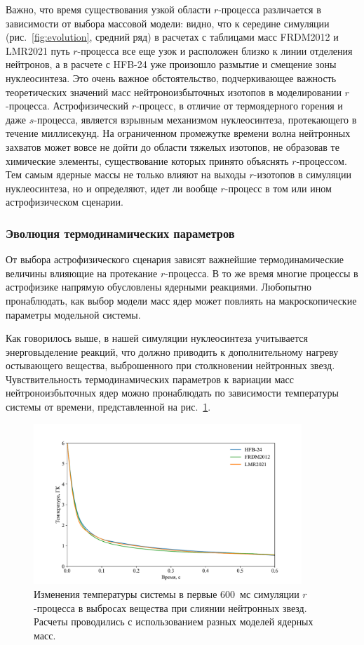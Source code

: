 Важно, что время существования узкой области $r$-процесса различается в зависимости от выбора массовой модели: видно, что к середине симуляции (рис.~\ref{fig:evolution}, средний ряд) в расчетах с таблицами масс FRDM2012 и LMR2021 путь $r$-процесса все еще узок и расположен близко к линии отделения нейтронов, а в расчете с HFB-24 уже произошло размытие и смещение зоны нуклеосинтеза. Это очень важное обстоятельство, подчеркивающее важность теоретических значений масс нейтроноизбыточных изотопов в моделировании $r$-процесса. Астрофизический $r$-процесс, в отличие от термоядерного горения и даже $s$-процесса, является взрывным механизмом нуклеосинтеза, протекающего в течение миллисекунд. На ограниченном промежутке времени волна нейтронных захватов может вовсе не дойти до области тяжелых изотопов, не образовав те химические элементы, существование которых принято объяснять $r$-процессом. Тем самым ядерные массы не только влияют на выходы $r$-изотопов в симуляции нуклеосинтеза, но и определяют, идет ли вообще $r$-процесс в том или ином астрофизическом сценарии.

\subsubsection{Эволюция термодинамических параметров}
От выбора астрофизического сценария зависят важнейшие термодинамические величины влияющие на протекание $r$-процесса. В то же время многие процессы в астрофизике напрямую обусловлены ядерными реакциями. Любопытно пронаблюдать, как выбор модели масс ядер может повлиять на макроскопические параметры модельной системы.

Как говорилось выше, в нашей симуляции нуклеосинтеза учитывается энерговыделение реакций, что должно приводить к дополнительному нагреву остывающего вещества, выброшенного при столкновении нейтронных звезд. Чувствительность термодинамических параметров к вариации масс нейтроноизбыточных ядер можно пронаблюдать по зависимости температуры системы от времени, представленной на рис.~\ref{fig:temp}.

\begin{figure}
\centering
\includegraphics[width=0.9\textwidth]{pics/temp.pdf}
\caption{Изменения температуры системы в первые 600~мс симуляции $r$-процесса в выбросах вещества при слиянии нейтронных звезд. Расчеты проводились с использованием разных моделей ядерных масс.}
\label{fig:temp}
\end{figure}

